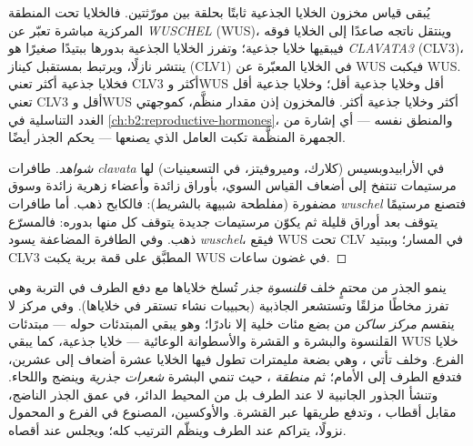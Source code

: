 \begin{proposition}\label{prop:b2:plant-meristems:wus}
يُبقى قياس مخزون الخلايا الجذعية ثابتًا بحلقة بين
مورّثتين. فالخلايا تحت المنطقة المركزية مباشرة تعبّر عن
 \emph{WUSCHEL} (WUS)، وينتقل ناتجه صاعدًا
إلى الخلايا فوقه فيبقيها خلايا جذعية؛ وتفرز الخلايا
الجذعية بدورها ببتيدًا صغيرًا هو \emph{CLAVATA3} (CLV3)،
ينتشر نازلًا، ويرتبط بمستقبل كيناز (CLV1) في الخلايا المعبّرة
عن WUS فيكبت WUS. فخلايا جذعية أكثر تعني CLV3 أكثر وWUS أقل
وخلايا جذعية أقل؛ وخلايا جذعية أقل تعني CLV3 أقل وWUS أكثر وخلايا
جذعية أكثر. فالمخزون إذن مقدار منظَّم، كموجهتي الغدد
التناسلية في \cref{ch:b2:reproductive-hormones}، والمنطق نفسه ---
أي إشارة من الجمهرة المنظَّمة تكبت العامل
الذي يصنعها --- يحكم  الجذر أيضًا.
\end{proposition}
\begin{proof}[شواهد]
طافرات \emph{clavata} في الأرابيدوبسيس (كلارك، وميروفيتز، في التسعينيات) لها
مرستيمات تنتفخ إلى أضعاف القياس السوي، بأوراق زائدة
وأعضاء زهرية زائدة وسوق مضفورة (مفلطحة شبيهة بالشريط):
فالكابح ذهب. أما طافرات \emph{wuschel} فتصنع مرستيمًا
يتوقف بعد أوراق قليلة ثم يكوّن مرستيمات جديدة يتوقف كل منها
بدوره: فالمسرّع ذهب. وفي الطافرة المضاعفة يسود 
\emph{wuschel}، فيقع WUS تحت CLV في المسار؛
وببتيد CLV3 المطبَّق على قمة برية يكبت WUS في غضون
ساعات.
\end{proof}

\begin{proposition}\label{prop:b2:plant-meristems:ram}
ينمو الجذر من  محتمٍ خلف \emph{قلنسوة جذر}
تُسلخ خلاياها مع دفع الطرف في التربة وهي
تفرز مخاطًا مزلقًا وتستشعر الجاذبية (بحبيبات نشاء
تستقر في خلاياها). وفي مركز  لا ينقسم
\emph{مركز ساكن} من بضع مئات خلية إلا نادرًا؛
وهو يبقي المبتدئات حوله --- مبتدئات القلنسوة والبشرة و
القشرة والأسطوانة الوعائية --- خلايا جذعية، كما يبقي WUS
خلايا الفرع. وخلف  تأتي \emph{}، وهي بضعة مليمترات تطول فيها الخلايا عشرة
أضعاف إلى عشرين، فتدفع الطرف إلى الأمام؛ ثم \emph{منطقة
}، حيث تنمي البشرة \emph{شعرات جذرية} وينضج 
واللحاء. وتنشأ الجذور الجانبية لا عند الطرف بل من
المحيط الدائر، في عمق الجذر الناضج، مقابل أقطاب ،
وتدفع طريقها عبر القشرة. والأوكسين، المصنوع في الفرع و
المحمول نزولًا، يتراكم عند الطرف وينظّم الترتيب
كله؛ ويجلس  عند أقصاه.
\end{proposition}

